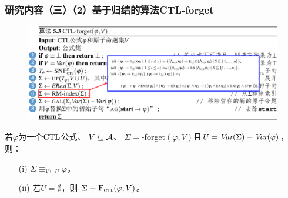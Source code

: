 \documentclass[aspectratio=1610, 9pt, CJK]{beamer}
\begin{document}
\begin{frame}
	\frametitle{研究内容（三）（2）基于归结的算法CTL-forget}
		
		
		
		\begin{figure}
			\includegraphics[scale=0.4]{figures/CTL-forget31}
		\end{figure}
		\begin{theorem}[可靠性] 
			若$\varphi$为一个$\textrm{CTL}$公式、 $V\subseteq\cal A$、 $\Sigma=$\CTL-forget$(\varphi,V)$且$U=\textit{Var}(\Sigma)-\textit{Var}(\varphi)$，则：
			\begin{itemize}
				\item[(i)] $\Sigma\equiv_{V\cup U}\varphi$，
				\item[(ii)] 若$U=\emptyset$，则 $\Sigma\equiv{\textsc{F}_{\textsc{ctl}}}(\varphi,V)$。
			\end{itemize}
		\end{theorem}
		
\end{frame}
\end{document}

